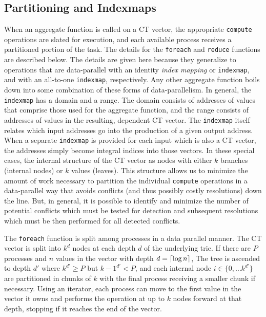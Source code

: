 \subsection{Partitioning and Indexmaps}
When an aggregate function is called on a CT vector, the appropriate \texttt{compute} 
operations are slated for execution, and each available process receives a partitioned 
portion of the task. The details for the \texttt{foreach} and \texttt{reduce} functions 
are described below. The details are given here because they generalize to operations 
that are data-parallel with an identity \textit{index mapping} or \texttt{indexmap}, and with an 
all-to-one \texttt{indexmap}, respectively. Any other aggregate function boils down into some 
combination of these forms of data-parallelism. In general, the \texttt{indexmap} has a domain 
and a range. The domain consists of addresses of values that comprise those used for 
the aggregate function, and the range consists of addresses of values in the resulting, 
dependent CT vector. The \texttt{indexmap} itself relates which input addresses 
go into the production of a given output address. When a separate \texttt{indexmap} is 
provided for each input which is also a CT vector, the addresses simply become integral 
indices into those vectors. In these special cases, the internal structure of the CT 
vector as nodes with either $k$ branches (internal nodes) or $k$ values (leaves). This 
structure allows us to minimize the amount of work necessary to partition the individual 
\texttt{compute} operations in a data-parallel way that avoids conflicts (and thus 
possibly costly resolutions) down the line. But, in general, it is possible to identify 
and minimize the number of potential conflicts which must be tested for detection and 
subsequent resolutions which must be then performed for all detected conflicts.

The \texttt{foreach} function is split among processes in a data parallel
manner. The CT vector is split into $k^d$ nodes at each depth $d$  of the
underlying trie. If there are $P$ processes and $n$ values in the vector with
depth $d = \lceil\log{n}\rceil$, The tree is ascended to depth $d'$ where $k^{d'} \geq P$
but ${k-1}^{d'} < P$, and each internal node $i \in \{0, \dots k^{d'}\}$ are
partitioned in chunks of $k$ with the final process receiving a smaller chunk if
necessary. Using an iterator, each process can move to the first value in the
vector it owns and performs the operation at up to $k$ nodes forward at that
depth, stopping if it reaches the end of the vector.

